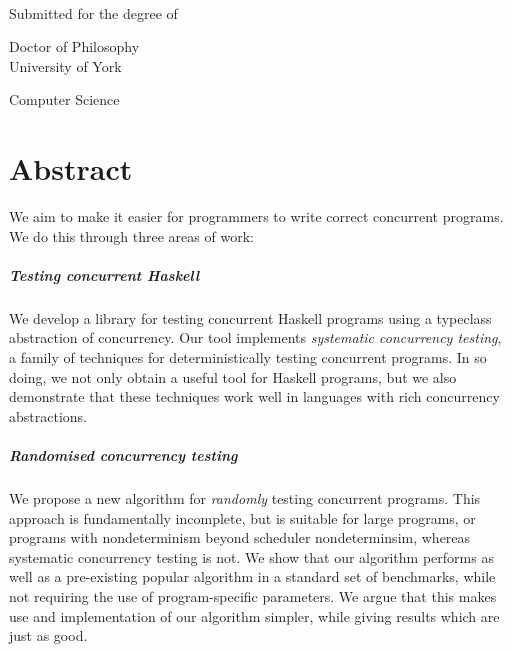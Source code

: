 \begin{titlepage}
  \begin{center}
    \makeatletter
    {\LARGE \@title}\\[1.5cm]
    {\large \@author}

    \vfill

    Submitted for the degree of\par
    Doctor of Philosophy\\[1.3cm]

    University of York\par
    Computer Science\\[1.3cm]

    \@date
    \makeatother
  \end{center}
\end{titlepage}

\chapter*{Abstract}

We aim to make it easier for programmers to write correct concurrent
programs.  We do this through three areas of work:

\paragraph{Testing concurrent Haskell}
We develop a library for testing concurrent Haskell programs using a
typeclass abstraction of concurrency.  Our tool implements
\emph{systematic concurrency testing}, a family of techniques for
deterministically testing concurrent programs.  In so doing, we not
only obtain a useful tool for Haskell programs, but we also
demonstrate that these techniques work well in languages with rich
concurrency abstractions.

\paragraph{Randomised concurrency testing}
We propose a new algorithm for \emph{randomly} testing concurrent
programs.  This approach is fundamentally incomplete, but is suitable
for large programs, or programs with nondeterminism beyond scheduler
nondeterminsim, whereas systematic concurrency testing is not.  We
show that our algorithm performs as well as a pre-existing popular
algorithm in a standard set of benchmarks, while not requiring the use
of program-specific parameters.  We argue that this makes use and
implementation of our algorithm simpler, while giving results which
are just as good.

